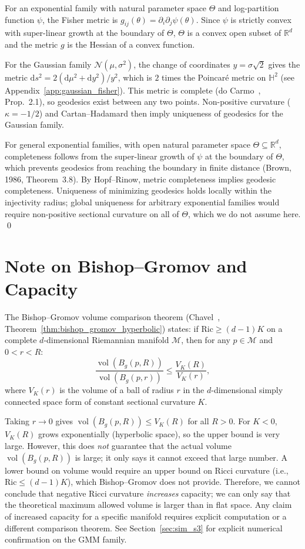 \documentclass[a4paper,fleqn]{cas-dc}
\DeclareMathOperator{\vol}{vol}
\newcommand{\R}{\mathbb{R}}
\newcommand{\calM}{\mathcal{M}}
\begin{document}
For an exponential family with natural parameter space $\Theta$ and
log-partition function $\psi$, the Fisher metric is
$g_{ij}(\theta) = \partial_i\partial_j\psi(\theta)$.  Since $\psi$ is
strictly convex with super-linear growth at the boundary of $\Theta$,
$\Theta$ is a convex open subset of $\R^d$ and the metric $g$ is the
Hessian of a convex function.

For the Gaussian family $\mathcal{N}(\mu,\sigma^2)$, the change of
coordinates $y = \sigma\sqrt{2}$ gives the metric
$\mathrm{d}s^2 = 2(\mathrm{d}\mu^2 + \mathrm{d}y^2)/y^2$, which is
$2$ times the Poincar\'{e} metric on $\mathbb{H}^2$ (see
Appendix~\ref{app:gaussian_fisher}).  This metric is complete (do
Carmo~\cite{do2002riemannian}, Prop.~2.1), so geodesics exist
between any two points.  Non-positive curvature ($\kappa=-1/2$)
and Cartan--Hadamard then imply uniqueness of geodesics for the
Gaussian family.

For general exponential families, with open natural parameter space
$\Theta \subseteq \R^d$, completeness follows from the super-linear
growth of $\psi$ at the boundary of $\Theta$, which prevents geodesics
from reaching the boundary in finite distance (Brown, 1986,
Theorem~3.8).  By Hopf--Rinow, metric completeness implies geodesic
completeness.  Uniqueness of minimizing geodesics holds locally within
the injectivity radius; global uniqueness for arbitrary exponential
families would require non-positive sectional curvature on all of
$\Theta$, which we do not assume here.  \qed

\section{Note on Bishop–Gromov and Capacity}
\label{app:bishop_gromov_corrected}

The Bishop–Gromov volume comparison theorem (Chavel~\cite{chavel2006riemannian},
Theorem~\ref{thm:bishop_gromov_hyperbolic}) states: if $\mathrm{Ric} \geq (d-1)K$ on a complete
$d$-dimensional Riemannian manifold $\calM$, then for any $p \in \calM$
and $0 < r < R$:
\[
  \frac{\vol(B_g(p, R))}{\vol(B_g(p, r))} \leq \frac{V_K(R)}{V_K(r)},
\]
where $V_K(r)$ is the volume of a ball of radius $r$ in the
$d$-dimensional simply connected space form of constant sectional
curvature $K$.

Taking $r \to 0$ gives $\vol(B_g(p,R)) \leq V_K(R)$ for all $R>0$.
For $K<0$, $V_K(R)$ grows exponentially (hyperbolic space), so the
upper bound is very large.  However, this does \emph{not} guarantee that
the actual volume $\vol(B_g(p,R))$ is large; it only says it cannot
exceed that large number.  A lower bound on volume would require an
upper bound on Ricci curvature (i.e., $\mathrm{Ric} \leq (d-1)K$),
which Bishop–Gromov does not provide.  Therefore, we cannot conclude
that negative Ricci curvature \emph{increases} capacity; we can only say
that the theoretical maximum allowed volume is larger than in flat space.
Any claim of increased capacity for a specific manifold requires
explicit computation or a different comparison theorem.
See Section~\ref{sec:sim_s3} for explicit numerical confirmation on the GMM family.
\end{document}
